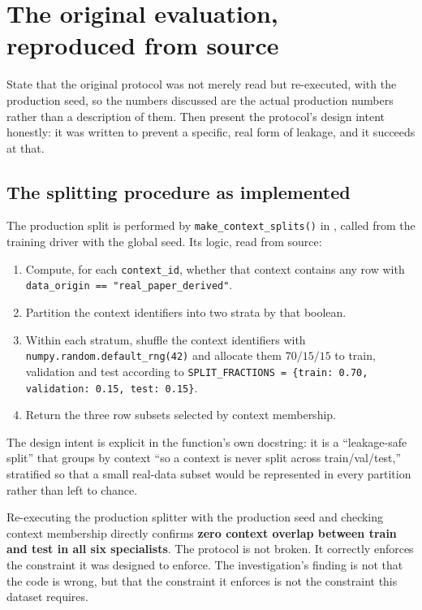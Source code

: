 \chapter{The original evaluation, reproduced from source}
\label{ch:original}

\begin{saybox}[title=What to say at the start of this section]
State that the original protocol was not merely read but re-executed, with
the production seed, so the numbers discussed are the actual production
numbers rather than a description of them. Then present the protocol's
design intent honestly: it was written to prevent a specific, real form of
leakage, and it succeeds at that.
\end{saybox}

\section{The splitting procedure as implemented}

The production split is performed by \texttt{make\_context\_splits()} in
, called from the training driver with the global
seed. Its logic, read from source:

\begin{enumerate}[leftmargin=1.5em, itemsep=2pt]
\item Compute, for each \texttt{context\_id}, whether that context contains
  any row with \texttt{data\_origin == "real\_paper\_derived"}.
\item Partition the context identifiers into two strata by that boolean.
\item Within each stratum, shuffle the context identifiers with
  \texttt{numpy.random.default\_rng(42)} and allocate them $70/15/15$ to
  train, validation and test according to
  \texttt{SPLIT\_FRACTIONS = \{train: 0.70, validation: 0.15, test: 0.15\}}.
\item Return the three row subsets selected by context membership.
\end{enumerate}

The design intent is explicit in the function's own docstring: it is a
``leakage-safe split'' that groups by context ``so a context is never split
across train/val/test,'' stratified so that a small real-data subset would
be represented in every partition rather than left to chance.

\begin{findingbox}[title=The protocol does what it claims --- and that is the point]
Re-executing the production splitter with the production seed and checking
context membership directly confirms \textbf{zero context overlap between
train and test in all six specialists}. The protocol is not broken. It
correctly enforces the constraint it was designed to enforce. The
investigation's finding is not that the code is wrong, but that the
constraint it enforces is not the constraint this dataset requires.
\end{findingbox}

